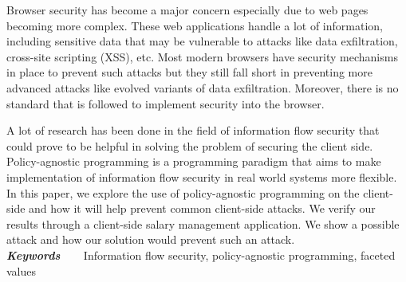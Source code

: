 \providecommand{\keywords}[1]{\textbf{\textit{Keywords~~~}} #1}

Browser security has become a major concern especially due to web pages becoming
more complex. These web applications handle a lot of information, including
sensitive data that may be vulnerable to attacks like data exfiltration,
cross-site scripting (XSS), etc. Most modern browsers have security mechanisms in
place to prevent such attacks but they still fall short in preventing more advanced
attacks like evolved variants of data exfiltration. Moreover, there is no standard
that is followed to implement security into the browser.
\par A lot of research has been done in the field of information flow security
that could prove to be helpful in solving the problem of securing the client side.
Policy-agnostic programming is a programming paradigm that aims to make implementation
of information flow security in real world systems more flexible. In this paper,
we explore the use of policy-agnostic programming on the client-side and how it
will help prevent common client-side attacks. We verify our results through a
client-side salary management application. We show a possible attack and how
our solution would prevent such an attack.\\
\keywords{Information flow security, policy-agnostic programming, faceted values}
